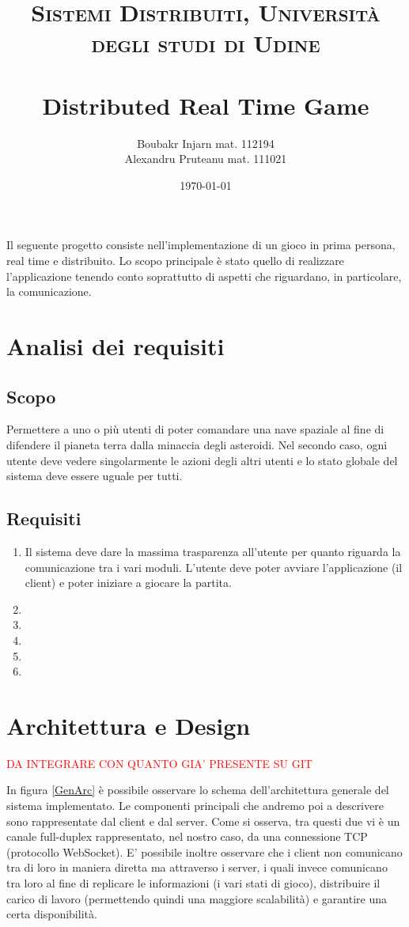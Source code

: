 \documentclass[paper=a4, fontsize=11pt]{scrartcl} %
\title{	
\normalfont \normalsize 
\textsc{Sistemi Distribuiti, Università degli studi di Udine} \\ [25pt] %
\horrule{0.5pt} \\[0.4cm] %
\huge Distributed Real Time Game %
\horrule{2pt} \\[0.5cm] %
}
\author{Boubakr Injarn mat. 112194\\Alexandru Pruteanu mat. 111021} %
\date{\normalsize\today} %
\numberwithin{equation}{section} %
\numberwithin{figure}{section} %
\numberwithin{table}{section} %
\begin{document}
\maketitle %
\newpage
\tableofcontents
\listoffigures
\newpage
\textbf{\abstractname}

Il seguente progetto consiste nell'implementazione di un gioco in prima persona, real time e distribuito. Lo scopo principale è stato quello di realizzare l'applicazione tenendo conto soprattutto di aspetti che riguardano, in particolare, la comunicazione.
\section{Analisi dei requisiti}
\subsection{Scopo}
Permettere a uno o più utenti di poter comandare una nave spaziale al fine di difendere il pianeta terra dalla minaccia degli asteroidi. Nel secondo caso, ogni utente deve vedere singolarmente le azioni degli altri utenti e lo stato globale del sistema deve essere uguale per tutti.
\subsection{Requisiti}
\begin{enumerate}
\item Il sistema deve dare la massima trasparenza all'utente per quanto riguarda la comunicazione tra i vari moduli. L'utente deve poter avviare l'applicazione (il client) e poter iniziare a giocare la partita.
\item 
\item
\item
\item
\item
\end{enumerate}

\section{Architettura e Design}
\textcolor{red}{DA INTEGRARE CON QUANTO GIA' PRESENTE SU GIT}

In figura \ref{GenArc} è possibile osservare lo schema dell'architettura generale del sistema implementato. Le componenti principali che andremo poi a descrivere sono rappresentate dal client e dal server. Come si osserva, tra questi due vi è un canale full-duplex rappresentato, nel nostro caso, da una connessione TCP (protocollo WebSocket). E' possibile inoltre osservare che i client non comunicano tra di loro in maniera diretta ma attraverso i server, i quali invece comunicano tra loro al fine di replicare le informazioni (i vari stati di gioco), distribuire il carico di lavoro (permettendo quindi una maggiore scalabilità) e garantire una certa disponibilità.
\end{document}
